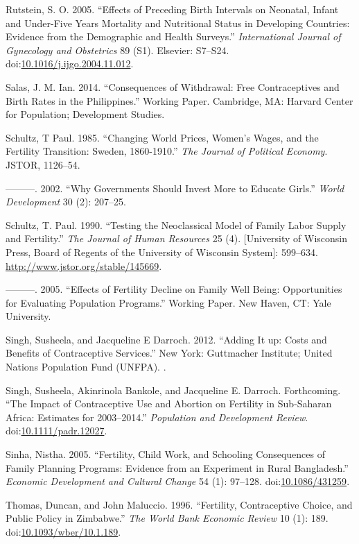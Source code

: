 \documentclass[]{article}
\begin{document}
Rutstein, S. O. 2005. ``Effects of Preceding Birth Intervals on Neonatal, Infant and Under-Five Years Mortality and Nutritional Status in Developing Countries: Evidence from the Demographic and Health Surveys.'' \emph{International Journal of Gynecology and Obstetrics} 89 (S1). Elsevier: S7--S24. doi:\href{https://doi.org/10.1016/j.ijgo.2004.11.012}{10.1016/j.ijgo.2004.11.012}.

Salas, J. M. Ian. 2014. ``Consequences of Withdrawal: Free Contraceptives and Birth Rates in the Philippines.'' Working Paper. Cambridge, MA: Harvard Center for Population; Development Studies.

Schultz, T Paul. 1985. ``Changing World Prices, Women's Wages, and the Fertility Transition: Sweden, 1860-1910.'' \emph{The Journal of Political Economy}. JSTOR, 1126--54.

---------. 2002. ``Why Governments Should Invest More to Educate Girls.'' \emph{World Development} 30 (2): 207--25.

Schultz, T. Paul. 1990. ``Testing the Neoclassical Model of Family Labor Supply and Fertility.'' \emph{The Journal of Human Resources} 25 (4). {[}University of Wisconsin Press, Board of Regents of the University of Wisconsin System{]}: 599--634. \url{http://www.jstor.org/stable/145669}.

---------. 2005. ``Effects of Fertility Decline on Family Well Being: Opportunities for Evaluating Population Programs.'' Working Paper. New Haven, CT: Yale University.

Singh, Susheela, and Jacqueline E Darroch. 2012. ``Adding It up: Costs and Benefits of Contraceptive Services.'' New York: Guttmacher Institute; United Nations Population Fund (UNFPA). .

Singh, Susheela, Akinrinola Bankole, and Jacqueline E. Darroch. Forthcoming. ``The Impact of Contraceptive Use and Abortion on Fertility in Sub-Saharan Africa: Estimates for 2003--2014.'' \emph{Population and Development Review}. doi:\href{https://doi.org/10.1111/padr.12027}{10.1111/padr.12027}.

Sinha, Nistha. 2005. ``Fertility, Child Work, and Schooling Consequences of Family Planning Programs: Evidence from an Experiment in Rural Bangladesh.'' \emph{Economic Development and Cultural Change} 54 (1): 97--128. doi:\href{https://doi.org/10.1086/431259}{10.1086/431259}.

Thomas, Duncan, and John Maluccio. 1996. ``Fertility, Contraceptive Choice, and Public Policy in Zimbabwe.'' \emph{The World Bank Economic Review} 10 (1): 189. doi:\href{https://doi.org/10.1093/wber/10.1.189}{10.1093/wber/10.1.189}.
\end{document}
